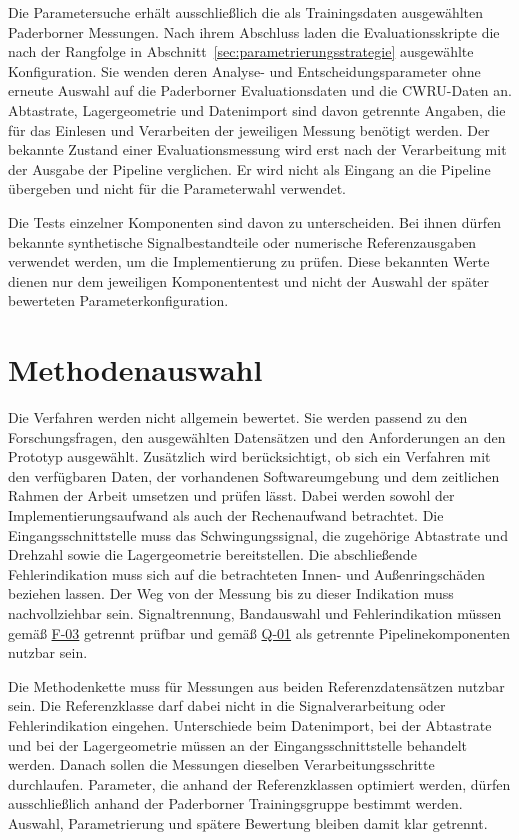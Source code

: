 Die Parametersuche erhält ausschließlich die als Trainingsdaten ausgewählten
Paderborner Messungen. Nach ihrem Abschluss laden die Evaluationsskripte die
nach der Rangfolge in Abschnitt~\ref{sec:parametrierungsstrategie} ausgewählte
Konfiguration. Sie wenden deren Analyse- und Entscheidungsparameter ohne
erneute Auswahl auf die Paderborner Evaluationsdaten und die CWRU-Daten an.
Abtastrate, Lagergeometrie und Datenimport sind davon getrennte Angaben, die
für das Einlesen und Verarbeiten der jeweiligen Messung benötigt werden. Der
bekannte Zustand einer Evaluationsmessung wird erst nach der Verarbeitung mit
der Ausgabe der Pipeline verglichen. Er wird nicht als Eingang an die
Pipeline übergeben und nicht für die Parameterwahl verwendet.

Die Tests einzelner Komponenten sind davon zu unterscheiden. Bei ihnen dürfen
bekannte synthetische Signalbestandteile oder numerische Referenzausgaben
verwendet werden, um die Implementierung zu prüfen. Diese bekannten Werte
dienen nur dem jeweiligen Komponententest und nicht der Auswahl der später
bewerteten Parameterkonfiguration.

\section{Methodenauswahl}
\label{sec:methodenauswahl}


Die Verfahren werden nicht allgemein bewertet. Sie werden passend zu den
Forschungsfragen, den ausgewählten Datensätzen und den Anforderungen an den
Prototyp ausgewählt. Zusätzlich wird berücksichtigt, ob sich ein Verfahren mit
den verfügbaren Daten, der vorhandenen Softwareumgebung und dem zeitlichen
Rahmen der Arbeit umsetzen und prüfen lässt. Dabei werden sowohl der
Implementierungsaufwand als auch der Rechenaufwand betrachtet. Die
Eingangsschnittstelle muss das Schwingungssignal, die zugehörige Abtastrate und
Drehzahl sowie die Lagergeometrie bereitstellen. Die abschließende
Fehlerindikation muss sich auf die betrachteten Innen- und Außenringschäden
beziehen lassen. Der Weg von der Messung bis zu dieser Indikation muss
nachvollziehbar sein. Signaltrennung, Bandauswahl und Fehlerindikation müssen
gemäß \hyperlink{req:F-03}{F-03} getrennt prüfbar und gemäß \hyperlink{req:Q-01}{Q-01} als getrennte
Pipelinekomponenten nutzbar sein.

Die Methodenkette muss für Messungen aus beiden Referenzdatensätzen nutzbar
sein. Die Referenzklasse darf dabei nicht in die Signalverarbeitung oder
Fehlerindikation eingehen. Unterschiede beim Datenimport, bei der Abtastrate
und bei der Lagergeometrie müssen an der Eingangsschnittstelle behandelt
werden. Danach sollen die Messungen dieselben Verarbeitungsschritte
durchlaufen. Parameter, die anhand der Referenzklassen optimiert werden,
dürfen ausschließlich anhand der Paderborner Trainingsgruppe bestimmt werden.
Auswahl, Parametrierung und spätere Bewertung bleiben damit klar getrennt.

